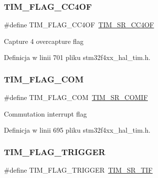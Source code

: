 \subsubsection{\texorpdfstring{T\+I\+M\+\_\+\+F\+L\+A\+G\+\_\+\+C\+C4\+OF}{TIM\_FLAG\_CC4OF}}
{\footnotesize\ttfamily \#define T\+I\+M\+\_\+\+F\+L\+A\+G\+\_\+\+C\+C4\+OF~\hyperlink{group___peripheral___registers___bits___definition_ga81ba979e8309b66808e06e4de34bc740}{T\+I\+M\+\_\+\+S\+R\+\_\+\+C\+C4\+OF}}

Capture 4 overcapture flag 

Definicja w linii 701 pliku stm32f4xx\+\_\+hal\+\_\+tim.\+h.

\mbox{\label{group___t_i_m___flag__definition_gad454d70205ce5bbf3b3c0e7e43d6df62}} 
\subsubsection{\texorpdfstring{T\+I\+M\+\_\+\+F\+L\+A\+G\+\_\+\+C\+OM}{TIM\_FLAG\_COM}}
{\footnotesize\ttfamily \#define T\+I\+M\+\_\+\+F\+L\+A\+G\+\_\+\+C\+OM~\hyperlink{group___peripheral___registers___bits___definition_ga91775c029171c4585e9cca6ebf1cd57a}{T\+I\+M\+\_\+\+S\+R\+\_\+\+C\+O\+M\+IF}}

Commutation interrupt flag 

Definicja w linii 695 pliku stm32f4xx\+\_\+hal\+\_\+tim.\+h.

\mbox{\label{group___t_i_m___flag__definition_gacacf94fcf8b5ee4287f2d5a56dce91b7}} 
\subsubsection{\texorpdfstring{T\+I\+M\+\_\+\+F\+L\+A\+G\+\_\+\+T\+R\+I\+G\+G\+ER}{TIM\_FLAG\_TRIGGER}}
{\footnotesize\ttfamily \#define T\+I\+M\+\_\+\+F\+L\+A\+G\+\_\+\+T\+R\+I\+G\+G\+ER~\hyperlink{group___peripheral___registers___bits___definition_ga7c8b16f3ced6ec03e9001276b134846e}{T\+I\+M\+\_\+\+S\+R\+\_\+\+T\+IF}}

